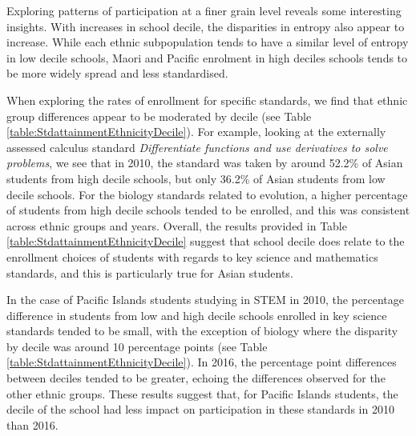 Exploring patterns of participation at a finer grain level reveals some interesting insights. With increases in school decile, the disparities in entropy also appear to increase. While each ethnic subpopulation tends to have a similar level of entropy in low decile schools, Maori and Pacific enrolment in high deciles schools tends to be more widely spread and less standardised. 

When exploring the rates of enrollment for specific standards, we find that ethnic group differences appear to be moderated by decile (see Table \ref{table:StdattainmentEthnicityDecile}). For example, looking at the externally assessed calculus standard \textit{Differentiate functions and use derivatives to solve problems}, we see that in 2010, the standard was taken by around 52.2\% of Asian students from high decile schools, but only 36.2\% of Asian students from low decile schools. For the biology standards related to evolution, a higher percentage of students from high decile schools tended to be enrolled, and this was consistent across ethnic groups and years. Overall, the results provided in Table \ref{table:StdattainmentEthnicityDecile} suggest that school decile does relate to the enrollment choices of students with regards to key science and mathematics standards, and this is particularly true for Asian students. 

In the case of Pacific Islands students studying in STEM in 2010, the percentage difference in students from low and high decile schools enrolled in key science standards tended to be small, with the exception of biology where the disparity by decile was around 10 percentage points (see Table \ref{table:StdattainmentEthnicityDecile}). In 2016, the percentage point differences between deciles tended to be greater, echoing the differences observed for the other ethnic groups. These results suggest that, for Pacific Islands students, the decile of the school had less impact on participation in these standards in 2010 than 2016. 


